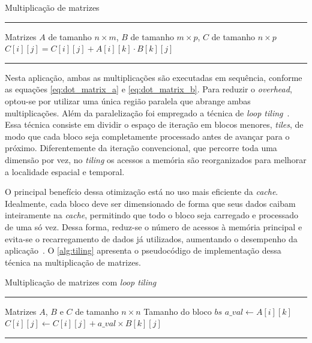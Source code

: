 \begin{algorithm}[htb]
	\caption{Multiplicação de matrizes}
	\label{alg:mul_matrix}
	\hrule
	\begin{algorithmic}[1]
		\REQUIRE Matrizes $A$ de tamanho $n \times m$, $B$ de tamanho $m \times p$, $C$ de tamanho $n \times p$
		\STATE $C[i][j] = C[i][j] + A[i][k] \cdot B[k][j]$
		\ENDFOR
		\ENDFOR
		\ENDFOR
	\end{algorithmic}
	\hrule
\end{algorithm}

Nesta aplicação, ambas as multiplicações são executadas em sequência, conforme as equações \autoref{eq:dot_matrix_a} e \autoref{eq:dot_matrix_b}. Para reduzir o \textit{overhead}, optou-se por utilizar uma única região paralela que abrange ambas multiplicações. Além da paralelização foi empregado a técnica de \textit{loop tiling}~\cite{bakos2016}. Essa técnica consiste em dividir o espaço de iteração em blocos menores, \textit{tiles}, de modo que cada bloco seja completamente processado antes de avançar para o próximo. Diferentemente da iteração convencional, que percorre toda uma dimensão por vez, no \textit{tiling} os acessos a memória são reorganizados para melhorar a localidade espacial e temporal.

O principal benefício dessa otimização está no uso mais eficiente da \textit{cache}. Idealmente, cada bloco deve ser dimensionado de forma que seus dados caibam inteiramente na \textit{cache}, permitindo que todo o bloco seja carregado e processado de uma só vez. Dessa forma, reduz-se o número de acessos à memória principal e evita-se o recarregamento de dados já utilizados, aumentando o desempenho da aplicação~\cite{bakos2016}. O \autoref{alg:tiling} apresenta o pseudocódigo de implementação dessa técnica na multiplicação de matrizes.

\begin{algorithm}[htb]
	\caption{Multiplicação de matrizes com \textit{loop tiling}}
	\label{alg:tiling}
	\hrule
	\begin{algorithmic}[1]
		\REQUIRE Matrizes $A$, $B$ e $C$ de tamanho $n \times n$
		\REQUIRE Tamanho do bloco $bs$
		\STATE $a\_val \gets A[i][k]$
		\STATE $C[i][j] \gets C[i][j] + a\_val \times B[k][j]$
		\ENDFOR
		\ENDFOR
		\ENDFOR
		\ENDFOR
		\ENDFOR
	\end{algorithmic}
	\hrule
	\fonte{}
\end{algorithm}


